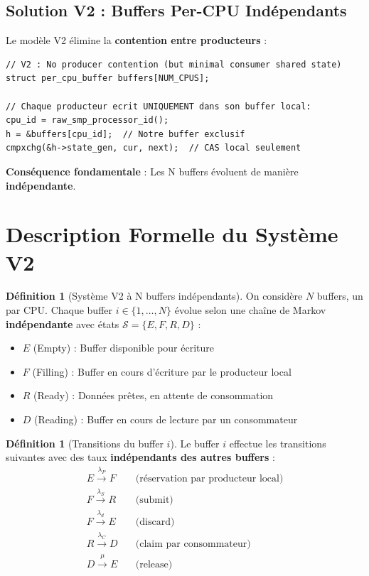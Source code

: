 \documentclass[11pt,a4paper]{article}
\theoremstyle{plain}
\theoremstyle{definition}
\newtheorem{definition}[theorem]{Définition}
\theoremstyle{remark}
\newcommand{\calS}{\mathcal{S}}
\begin{document}
\subsection{Solution V2 : Buffers Per-CPU Indépendants}

Le modèle V2 élimine la \textbf{contention entre producteurs} :

\begin{lstlisting}
// V2 : No producer contention (but minimal consumer shared state)
struct per_cpu_buffer buffers[NUM_CPUS];

// Chaque producteur ecrit UNIQUEMENT dans son buffer local:
cpu_id = raw_smp_processor_id();
h = &buffers[cpu_id];  // Notre buffer exclusif
cmpxchg(&h->state_gen, cur, next);  // CAS local seulement
\end{lstlisting}

\textbf{Conséquence fondamentale} : Les N buffers évoluent de manière \textbf{indépendante}.

\section{Description Formelle du Système V2}

\begin{definition}[Système V2 à N buffers indépendants]
On considère $N$ buffers, un par CPU. Chaque buffer $i \in \{1, \ldots, N\}$ évolue selon une chaîne de Markov \textbf{indépendante} avec états $\calS = \{E, F, R, D\}$ :
\begin{itemize}
    \item $E$ (Empty) : Buffer disponible pour écriture
    \item $F$ (Filling) : Buffer en cours d'écriture par le producteur local
    \item $R$ (Ready) : Données prêtes, en attente de consommation
    \item $D$ (Reading) : Buffer en cours de lecture par un consommateur
\end{itemize}
\end{definition}

\begin{definition}[Transitions du buffer $i$]
Le buffer $i$ effectue les transitions suivantes avec des taux \textbf{indépendants des autres buffers} :
\begin{align}
E \xrightarrow{\lambda_P} F & \quad \text{(réservation par producteur local)} \\
F \xrightarrow{\lambda_S} R & \quad \text{(submit)} \\
F \xrightarrow{\lambda_d} E & \quad \text{(discard)} \\
R \xrightarrow{\lambda_C} D & \quad \text{(claim par consommateur)} \\
D \xrightarrow{\mu} E & \quad \text{(release)}
\end{align}
\end{definition}
\end{document}
